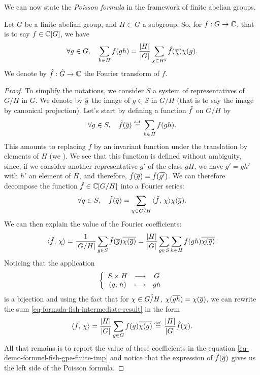  
We can now state the \textit{Poisson formula} in the framework of finite abelian groups.
 
\begin{thm}
  Let $ G $ be a finite abelian group, and $ H \subset G $ a subgroup. So, for $ f: G \rightarrow \mathbb{C} $, that is to say $ f \in \mathbb{C} [G] $, we have
\begin{equation}
\label{eq-formula-fish-finished-grp}
\forall g \in G, \quad \sum_{h \in H}{f(gh)} = \frac{| H |}{|G|} \sum_{\chi \in H^{\sharp}}{\hat{f} (\overline{\chi}) \chi (g)}.
\end{equation}
We denote by $ \hat{f}: \hat{G} \rightarrow \mathbb{C} $ the Fourier transform of $ f $.
\end{thm}

\begin{proof}
 To simplify the notations, we consider $ S $ a system of representatives of $ G / H $ in $ G $. We denote by $ \overline{g} $ the image of $ g \in S $ in $ G / H $ (that is to say the image by canonical projection). Let's start by defining a function $ \tilde{f} $ on $ G / H $ by
\begin{equation*}
\forall g \in S, \quad \tilde{f} (\overline{g}) \stackrel{\mbox{\upshape\tiny def.}}{=} \sum_{h \in H}{f(gh)}.
\end{equation*}
This amounts to replacing $ f $ by an invariant function under the translation by elements of $ H $ (we ). We see that this function is defined without ambiguity, since, if we consider another representative $ g'$ of the class $ g H $, we have $ g' = g h'$ with $ h' $ an element of $ H $, and therefore, $ \tilde{f} (\overline{g}) = \tilde{f} (\overline{g'}) $. We can therefore decompose the function $ \tilde{f} \in \mathbb{C} [G / H] $ into a Fourier series:
\begin{equation}
\label{eq-demo-formuel-fish-gpe-finite-tmp}
\forall g \in S, \quad \tilde{f} (\overline{g}) = \sum_{\chi \in \hat{G / H}}{\langle \tilde{f},\,\chi \rangle \chi (\overline{g})}.
\end{equation}
We can then explain the value of the Fourier coefficients:
\begin{equation}
\label{eq-formula-fish-intermediate-result}
\langle \tilde{f},\,\chi\rangle = \frac{1}{| G / H |} \sum_{g \in S}{\tilde{f} (\overline{g}) \overline{\chi (\overline{g})}} = \frac{| H |}{|G|} \sum_{g \in S}{\sum_{h \in H}{f(gh) \overline{\chi (\overline{g})}}}.
\end{equation}
Noticing that the application
\begin{equation*}
{\left\{ \begin{array}{ccc} S \times H & \longrightarrow & G \\ (g, \, h) & \longmapsto & gh \end{array} \right.}
\end{equation*}
is a bijection and using the fact that for $ \chi \in \hat{G / H} $, $ \chi (\overline{gh}) = \chi (\overline{g}) $, we can rewrite the sum \eqref{eq-formula-fish-intermediate-result} in the form
\begin{equation*}
\langle \tilde{f},\,\chi\rangle = \frac{| H |}{|G|} \sum_{g \in G}{f(g) \overline{\chi (g)}} \stackrel{\mbox{\upshape\tiny def.}}{=} \frac{| H |}{|G|} \hat{f} (\overline{\chi}).
\end{equation*}
All that remains is to report the value of these coefficients in the equation \eqref{eq-demo-formuel-fish-gpe-finite-tmp} and notice that the expression of $ \tilde{f} (\overline{g}) $ gives us the left side of the Poisson formula.
\end{proof}
